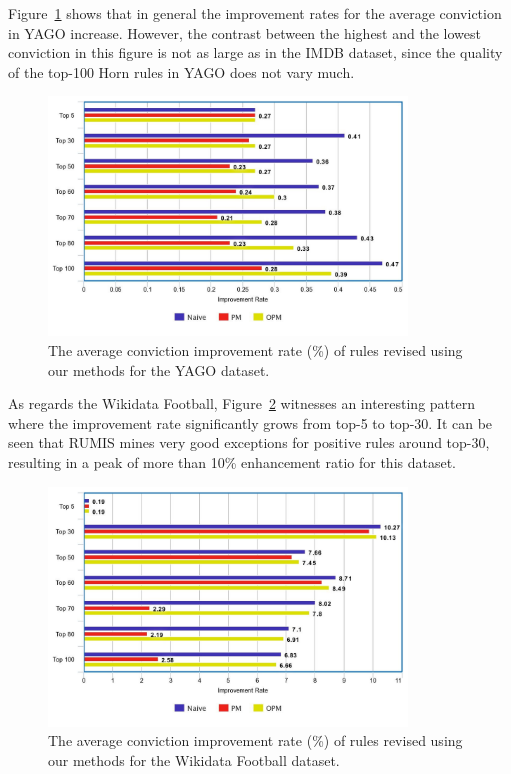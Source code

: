 Figure~\ref{fig_1_5_yago} shows that in general the improvement rates for the average conviction in YAGO increase. However, the contrast between the highest and the lowest conviction in this figure is not as large as in the IMDB dataset, since the quality of the top-100 Horn rules in YAGO does not vary much.

\begin{figure}[ht]
\centering
\includegraphics[width=0.85\textwidth]{figures/table_1_5_yago.jpeg}
\caption{The average conviction improvement rate (\%) of rules revised using our methods for the YAGO dataset.}
\label{fig_1_5_yago}
\end{figure}

As regards the Wikidata Football, Figure~\ref{fig_1_5_wikidata} witnesses an interesting pattern where the improvement rate significantly grows from top-5 to top-30. It can be seen that RUMIS mines very good exceptions for positive rules around top-30, 
resulting in a peak of more than 10\% enhancement ratio for this dataset.

\begin{figure}[ht]
\centering
\includegraphics[width=0.85\textwidth]{figures/table_1_5_wikidata.jpeg}
\caption{The average conviction improvement rate (\%) of rules revised using our methods for the Wikidata Football dataset.}
\label{fig_1_5_wikidata}
\end{figure}

